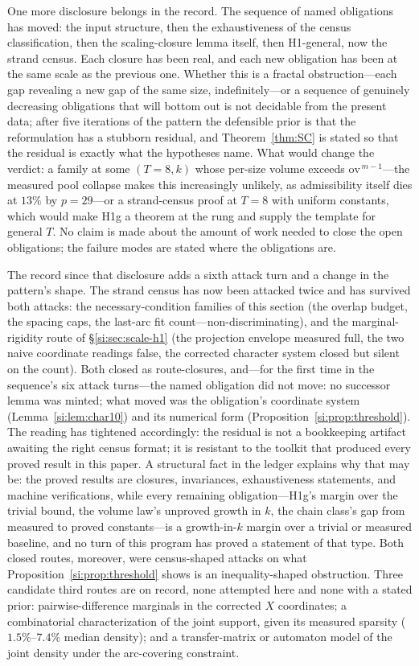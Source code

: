 \documentclass[11pt,a4paper]{article}
\numberwithin{equation}{section}
\theoremstyle{plain}
\theoremstyle{plain}
\theoremstyle{definition}
\theoremstyle{remark}
\begin{document}
One more disclosure belongs in the record. The sequence of named
obligations has moved: the input structure, then the exhaustiveness of
the census classification, then the scaling-closure lemma itself, then
H1-general, now the strand census. Each closure has been real, and
each new obligation has been at the same scale as the previous one.
Whether this is a fractal obstruction---each gap revealing a new gap of
the same size, indefinitely---or a sequence of genuinely decreasing
obligations that will bottom out is not decidable from the present
data; after five iterations of the pattern the defensible prior is that
the reformulation has a stubborn residual, and Theorem~\ref{thm:SC} is
stated so that the residual is exactly what the hypotheses name. What
would change the verdict: a family at some $(T=8,k)$ whose per-size
volume exceeds $\mathrm{ov}^{\,m-1}$---the measured pool collapse
makes this increasingly unlikely, as admissibility itself dies at
$13\%$ by $p=29$---or a strand-census proof at $T=8$ with uniform
constants, which would make H1g a theorem at the rung and supply the
template for general $T$. No claim is made about the amount of work
needed to close the open obligations; the
failure modes are stated where the obligations are.

The record since that disclosure adds a sixth attack turn and a change
in the pattern's shape. The strand census has now been attacked twice
and has survived both attacks: the necessary-condition families of
this section (the overlap budget, the spacing caps, the last-arc fit
count---non-discriminating), and the marginal-rigidity route of
\S\ref{si:sec:scale-h1} (the projection envelope measured full, the two
naive coordinate readings false, the corrected character system closed
but silent on the count). Both closed as route-closures, and---for the
first time in the sequence's six attack turns---the named obligation
did not move: no successor lemma was minted; what moved was the
obligation's coordinate system (Lemma~\ref{si:lem:char10}) and its
numerical form (Proposition~\ref{si:prop:threshold}). The reading
has tightened accordingly: the residual is not a bookkeeping artifact
awaiting the right census format; it is resistant to the toolkit that
produced every proved result in this paper. A structural fact in the
ledger explains why that may be: the proved results are closures,
invariances, exhaustiveness statements, and machine verifications,
while every remaining obligation---H1g's margin over the trivial
bound, the volume law's unproved growth in $k$, the chain class's gap
from measured to proved constants---is a growth-in-$k$ margin over a
trivial or measured baseline, and no turn of this program has proved a
statement of that type. Both closed routes, moreover, were
census-shaped attacks on what Proposition~\ref{si:prop:threshold} shows
is an inequality-shaped obstruction. Three candidate third routes are
on record, none attempted here and none with a stated prior:
pairwise-difference marginals in the corrected $X$ coordinates; a
combinatorial characterization of the joint support, given its
measured sparsity ($1.5\%$--$7.4\%$ median density); and a
transfer-matrix or automaton model of the joint density under the
arc-covering constraint.
\end{document}
